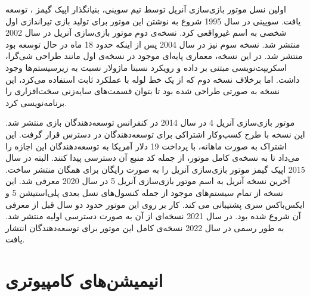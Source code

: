 اولین نسل موتور بازی‌سازی آنریل توسط تیم سوینی، بنیانگذار اپیک گیمز
،
توسعه یافت.
سویینی در سال 1995 شروع به نوشتن این موتور برای تولید بازی‌ تیراندازی اول شخصی به اسم غیرواقعی
کرد.
نسخه‌‌ی دوم موتور بازی‌سازی آنریل در سال 2002 منتشر شد. نسخه سوم نیز در سال 2004 پس از اینکه حدود 18 ماه در حال توسعه بود منتشر شد.
در این نسخه، معماری پایه‌ای موجود در نسخه‌ی اول مانند طراحی شی‌گرا، اسکریپت‌نویسی مبتنی بر داده و رویکرد نسبتا ماژولار نسبت به زیرسیستم‌ها وجود داشت.
اما برخلاف نسخه دوم که از یک خط لوله با عملکرد ثابت
استفاده می‌کرد، این نسخه به صورتی طراحی شده بود تا بتوان قسمت‌های سایه‌زنی سخت‌افزاری
را برنامه‌نویسی کرد.

موتور بازی‌سازی آنریل 4 در سال 2014 در کنفرانس توسعه‌دهندگان بازی
منتشر شد.
این نسخه با طرح کسب‌و‌کار اشتراکی برای توسعه‌دهندگان در دسترس قرار گرفت. این اشتراک به صورت ماهانه، با پرداخت 19 دلار آمریکا به توسعه‌دهندگان این اجازه را می‌داد تا به نسخه‌ی کامل موتور، از جمله کد منبع 
آن
دسترسی پیدا‌ کنند.
البته در سال 2015 اپیک گیمز موتور بازی‌سازی آنریل را به صورت رایگان برای همگان منتشر ساخت.
آخرین نسخه آنریل به اسم موتور بازی‌سازی آنریل 5 در سال 2020 معرفی شد. این نسخه از تمام سیستم‌های موجود از جمله کنسول‌های نسل بعدی پلی‌استیشن 5
و ایکس‌باکس سری 
پشتیبانی می کند.
کار بر روی این موتور حدود دو سال قبل از معرفی آن شروع شده بود. در سال 2021 نسخه‌ای از آن به صورت دسترسی اولیه منتشر شد. به طور رسمی در سال 2022 نسخه‌ی کامل این موتور برای توسعه‌دهندگان انتشار یافت.
\cite{UnrealEngineWikiPedia}

\section{انیمیشن‌های کامپیوتری}
